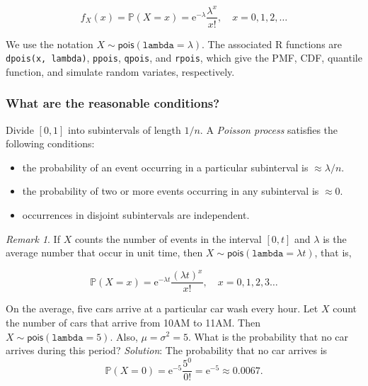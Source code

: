 \documentclass[]{book}
\providecommand{\tightlist}{%
  \setlength{\itemsep}{0pt}\setlength{\parskip}{0pt}}
\numberwithin{equation}{chapter}
\numberwithin{figure}{chapter}
\theoremstyle{plain}
\theoremstyle{definition}
\theoremstyle{remark}
\theoremstyle{definition}
\theoremstyle{definition}
\theoremstyle{remark}
\newtheorem*{remark}{Remark}
\let\BeginKnitrBlock\begin \let\EndKnitrBlock\end
\begin{document}
\begin{equation}
f_{X}(x)=\mathbb{P}(X=x)=\mathrm{e}^{-\lambda}\frac{\lambda^{x}}{x!},\quad x=0,1,2,\ldots
\end{equation}

We use the notation \(X\sim\mathsf{pois}(\mathtt{lambda}=\lambda)\). The
associated R functions are \texttt{dpois(x,\ lambda)}, \texttt{ppois},
\texttt{qpois}, and \texttt{rpois}, which give the PMF, CDF, quantile
function, and simulate random variates, respectively.

\subsubsection{What are the reasonable
conditions?}\label{what-are-the-reasonable-conditions}

Divide \([0,1]\) into subintervals of length \(1/n\). A \emph{Poisson
process}  satisfies the following conditions:

\begin{itemize}
\tightlist
\item
  the probability of an event occurring in a particular subinterval is
  \(\approx\lambda/n\).
\item
  the probability of two or more events occurring in any subinterval is
  \(\approx 0\).
\item
  occurrences in disjoint subintervals are independent.
\end{itemize}

\bigskip

\begin{remark}
If \(X\) counts the number of events in the interval \([0,t]\) and
\(\lambda\) is the average number that occur in unit time, then
\(X\sim\mathsf{pois}(\mathtt{lambda}=\lambda t)\), that is,

\begin{equation}
\mathbb{P}(X=x)=\mathrm{e}^{-\lambda t}\frac{(\lambda t)^{x}}{x!},\quad x=0,1,2,3\ldots
\end{equation}
\end{remark}

\bigskip

\BeginKnitrBlock{example}
\protect\hypertarget{ex:unnamed-chunk-240}{}{\label{ex:unnamed-chunk-240}}On
the average, five cars arrive at a particular car wash every hour. Let
\(X\) count the number of cars that arrive from 10AM to 11AM. Then
\(X\sim\mathsf{pois}(\mathtt{lambda}=5)\). Also, \(\mu=\sigma^{2}=5\).
What is the probability that no car arrives during this period?
\emph{Solution}: The probability that no car arrives is \[
\mathbb{P}(X=0)=\mathrm{e}^{-5}\frac{5^{0}}{0!}=\mathrm{e}^{-5}\approx0.0067.
\]
\EndKnitrBlock{example}
\end{document}
